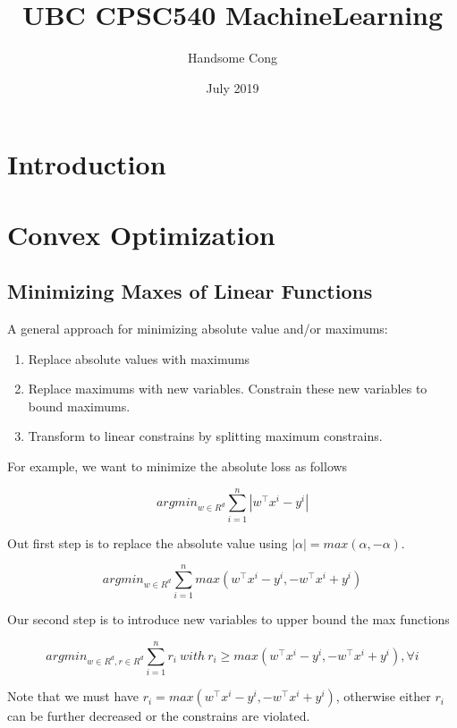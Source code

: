 \documentclass{article}
\title{UBC CPSC540 MachineLearning}
\author{Handsome Cong}
\date{July 2019}
\theoremstyle{definition}
\theoremstyle{remark}
\begin{document}
\maketitle

\section{Introduction}
\section{Convex Optimization}
\subsection{Minimizing Maxes of Linear Functions}
A general approach for minimizing absolute value and/or maximums:
\begin{enumerate}
    \item Replace absolute values with maximums
    \item Replace maximums with new variables. Constrain these new variables to bound maximums.
    \item Transform to linear constrains by splitting maximum constrains.
\end{enumerate}

For example, we want to minimize the absolute loss as follows

\begin{equation}
    argmin_{w \in R^{d}} \sum^{n}_{i=1}|w^{\top} x^{i} - y^{i}|
\end{equation}

Out first step is to replace the absolute value using $|\alpha| = max(\alpha, -\alpha)$.

\begin{equation}
    argmin_{w \in R^{d}} \sum^{n}_{i=1} max(w^{\top} x^{i} - y^{i}, -w^{\top} x^{i} + y^{i})
\end{equation}

Our second step is to introduce new variables to upper bound the max functions

\begin{equation}
    argmin_{w \in R^{d}, r \in R^{d}} \sum^{n}_{i=1} r_{i}\ with\ r_{i} \geq max(w^{\top} x^{i} - y^{i}, -w^{\top} x^{i} + y^{i}), \forall i
\end{equation}

Note that we must have $r_i = max(w^{\top} x^{i} - y^{i}, -w^{\top} x^{i} + y^{i})$, otherwise either $r_i$ can be further decreased or the constrains are violated.
\end{document}

